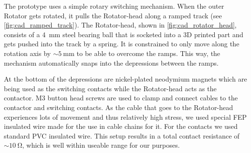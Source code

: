 \def\rotator{\textsf{Rotator}\xspace}
\def\rotatorhead{\textsf{Rotator-head}\xspace}

The prototype uses a simple rotary switching mechanism.
When the outer \rotator gets rotated, it pulls the \rotatorhead along a ramped track (see \autoref{fig:cad_ramped_track}).
The \rotatorhead, shown in \autoref{fig:cad_rotator_head}, consists of a \SI{4}{mm} steel bearing ball that is socketed into a 3D printed part and gets pushed into the track by a spring.
It is constrained to only move along the rotation axis by $\sim\SI{5}{\mm}$ to be able to overcome the ramps.
This way, the mechanism automatically snaps into the depressions between the ramps.

At the bottom of the depressions are nickel-plated neodymium magnets which are being used as the switching contacts while the \rotatorhead acts as the contactor.
M3 button head screws are used to clamp and connect cables to the contactor and switching contacts.
As the cable that goes to the \rotatorhead experiences lots of movement and thus relatively high stress, we used special FEP insulated wire made for the use in cable chains for it.
For the contacts we used standard PVC insulated wire.
This setup results in a total contact resistance of $\sim\SI{10}{\ohm}$, which is well within useable range for our purposes.

